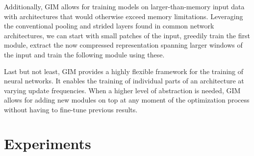 \documentclass{article}
\begin{document}
Additionally, GIM allows for training models on larger-than-memory input data with architectures that would otherwise exceed memory limitations. Leveraging the conventional pooling and strided layers found in common network architectures, we can start with small patches of the input, greedily train the first module, extract the now compressed representation spanning larger windows of the input and train the following module using these.

Last but not least, GIM provides a highly flexible framework for the training of neural networks. It enables the training of individual parts of an architecture at varying update frequencies. When a higher level of abstraction is needed, GIM allows for adding new modules on top at any moment of the optimization process without having to fine-tune previous results.


%
 

\section{Experiments}

\begin{figure}[t]
\begin{floatrow}
\end{floatrow}
\end{figure}
\end{document}
